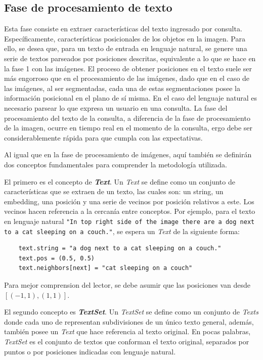\subsection*{Fase de procesamiento de texto}

Esta fase consiste en extraer características del texto ingresado por consulta. Específicamente, características posicionales de los objetos en la imagen. Para ello, se desea que, para un texto de entrada en lenguaje natural, se genere una serie de textos parseados por posiciones descritas, equivalente a lo que se hace en la fase 1 con las imágenes. El proceso de obtener posiciones en el texto suele ser más engorroso que en el procesamiento de las imágenes, dado que en el caso de las imágenes, al ser segmentadas, cada una de estas segmentaciones posee la información posicional en el plano de sí misma. En el caso del lenguaje natural es necesario parsear lo que expresa un usuario en una consulta. La fase del procesamiento del texto de la consulta, a diferencia de la fase de procesamiento de la imagen, ocurre en tiempo real en el momento de la consulta, ergo debe ser considerablemente rápida para que cumpla con las expectativas.

Al igual que en la fase de procesamiento de imágenes, aquí también se definirán dos conceptos fundamentales para comprender la metodología utilizada.

El primero es el concepto de \textit{\textbf{Text}}. Un \textit{Text} se define como un conjunto de características que se extraen de un texto, las cuales son: un string, un embedding, una posición y una serie de vecinos por posición relativos a este. Los vecinos hacen referencia a la cercanía entre conceptos. Por ejemplo, para el texto en lenguaje natural \verb|"In top right side of the image there are a dog next to a cat sleeping on a couch."|, se espera un \textit{Text} de la siguiente forma:

\begin{verbatim}
    text.string = "a dog next to a cat sleeping on a couch."
    text.pos = (0.5, 0.5)
    text.neighbors[next] = "cat sleeping on a couch"
\end{verbatim}

Para mejor comprension del lector, se debe asumir que las posiciones van desde $[(-1,1), (1,1)]$.

El segundo concepto es \textit{\textbf{TextSet}}. Un \textit{TextSet} se define como un conjunto de \textit{Texts} donde cada uno de representan subdivisiones de un \'unico texto general, además, también posee un \textit{Text} que hace referencia al texto original. En pocas palabras, \textit{TextSet} es el conjunto de textos que conforman el texto original, separados por puntos o por posiciones indicadas con lenguaje natural.

